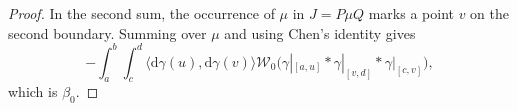 \documentclass[10pt,a4paper]{amsart}
\newcommand{\cW}{\mathcal{W}}
\newcommand{\dd}{\mathrm{d}}
\begin{document}
\begin{proof}
In the second sum, the occurrence of $\mu$ in $J=P\mu Q$ marks a point $v$ on the second boundary. Summing over $\mu$ and using Chen's identity gives
\begin{equation}
-\int_a^b\!\!\int_c^d \bigl\langle\dd\gamma(u),\dd\gamma(v)\bigr\rangle \cW_0\bigl( \gamma|_{[a,u]}* \gamma|_{[v,d]}*\gamma|_{[c,v]} \bigr),
\end{equation}
which is $\beta_0$. 
\end{proof}
\end{document}
